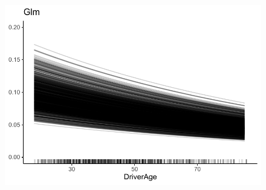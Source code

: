 \begin{figure}
\begin{minipage}{0.45\linewidth}
\includegraphics[scale=0.6]{Graphiques/iceDriverAgeGlm}
\end{minipage}
\end{figure}

